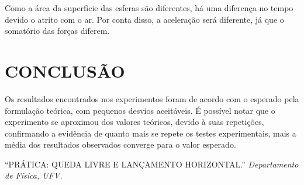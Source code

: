 \documentclass[10pt]{article}
\begin{document}
Como a área da superfície das esferas são diferentes, há uma diferença no tempo devido o atrito com o ar. Por conta disso, a aceleração será diferente, já que o somatório das forças diferem.

\section{CONCLUSÃO}

Os resultados encontrados nos experimentos foram de acordo com o esperado pela formulação teórica, com pequenos desvios aceitáveis. É possível notar que o experimento se aproximou dos valores teóricos, devido à suas repetições, confirmando a evidência de quanto mais se repete os testes experimentais, mais a média dos resultados observados converge para o valor esperado.  


\begin{thebibliography}{9}
	
	``PRÁTICA: QUEDA LIVRE E LANÇAMENTO HORIZONTAL.''
	\textit{Departamento de Física, UFV.}


\end{thebibliography}
\end{document}
